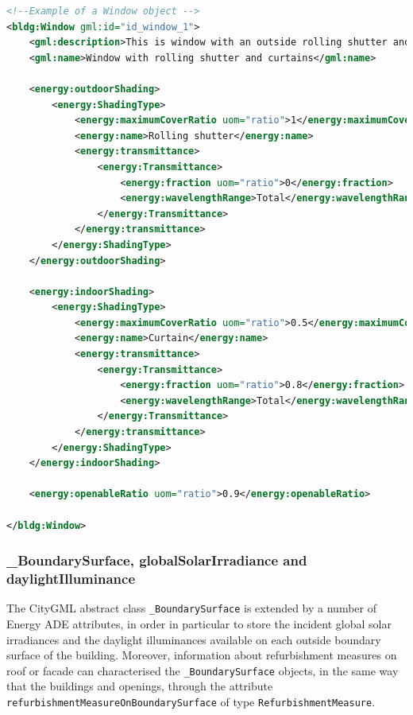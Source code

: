 \documentclass[a4paper,12pt]{article}
\begin{document}
\begin{lstlisting}[language=XML]
<!--Example of a Window object -->
<bldg:Window gml:id="id_window_1">
    <gml:description>This is window with an outside rolling shutter and curtains inside</gml:description>
    <gml:name>Window with rolling shutter and curtains</gml:name>

    <energy:outdoorShading>
        <energy:ShadingType>
            <energy:maximumCoverRatio uom="ratio">1</energy:maximumCoverRatio>
            <energy:name>Rolling shutter</energy:name>
            <energy:transmittance>
                <energy:Transmittance>
                    <energy:fraction uom="ratio">0</energy:fraction>
                    <energy:wavelengthRange>Total</energy:wavelengthRange>
                </energy:Transmittance>
            </energy:transmittance>
        </energy:ShadingType>
    </energy:outdoorShading>

    <energy:indoorShading>
        <energy:ShadingType>
            <energy:maximumCoverRatio uom="ratio">0.5</energy:maximumCoverRatio>
            <energy:name>Curtain</energy:name>
            <energy:transmittance>
                <energy:Transmittance>
                    <energy:fraction uom="ratio">0.8</energy:fraction>
                    <energy:wavelengthRange>Total</energy:wavelengthRange>
                </energy:Transmittance>
            </energy:transmittance>
        </energy:ShadingType>
    </energy:indoorShading>

    <energy:openableRatio uom="ratio">0.9</energy:openableRatio>

</bldg:Window>
\end{lstlisting}

\subsubsection{\_BoundarySurface, globalSolarIrradiance and
daylightIlluminance}\label{boundarysurface-globalsolarirradiance-and-daylightilluminance}

The CityGML abstract class \lstinline!_BoundarySurface! is extended by a
number of Energy ADE attributes, in order in particular to store the
incident global solar irradiances and the daylight illuminances
available on each outside boundary surface of the building. Moreover,
information about refurbishment measures on roof or facade can
characterised the \lstinline!_BoundarySurface! objects, in the same way
that the buildings and openings, through the attribute
\lstinline!refurbishmentMeasureOnBoundarySurface! of type
\lstinline!RefurbishmentMeasure!.
\end{document}
